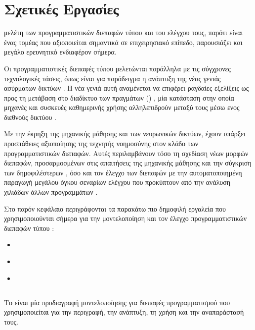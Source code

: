 \chapter{Σχετικές Εργασίες}
 μελέτη των προγραμματιστικών διεπαφών τύπου  και του ελέγχου τους,
παρότι είναι ένας τομέας που αξιοποιείται σημαντικά σε επιχειρησιακό επίπεδο,
παρουσιάζει και μεγάλο ερευνητικό ενδιαφέρον σήμερα.

Οι προγραμματιστικές διεπαφές τύπου  μελετώνται παράλληλα με τις σύγχρονες τεχνολογικές τάσεις,
όπως είναι για παράδειγμα η ανάπτυξη της νέας γενιάς ασύρματων δικτύων  \cite{mayer2018restful}.
Η νέα γενιά αυτή αναμένεται να επιφέρει ραγδαίες εξελίξεις ως προς τη μετάβαση στο διαδίκτυο των πραγμάτων () \cite{wang2018iot},
μία κατάσταση στην οποία μηχανές και συσκευές καθημερινής χρήσης αλληλεπιδρούν μεταξύ τους 
μέσω ενος διεθνούς δικτύου \cite{gubbi2013internet}. 

Με την έκρηξη της μηχανικής μάθησης και των νευρωνικών δικτύων,
έχουν υπάρξει προσπάθειες αξιοποίησης της τεχνητής νοημοσύνης στον κλάδο των προγραμματιστικών διεπαφών.
Αυτές περιλαμβάνουν 
τόσο τη σχεδίαση νέων μορφών διεπαφών, προσαρμοσμένων στις απαιτήσεις της μηχανικής μάθησης \cite{garcia2019deepaas}\cite{howard2020fastai}
και την σύγκριση των δημοφιλέστερων \cite{kubany2020comparison},
όσο και τον έλεγχο των διεπαφών με την αυτοματοποιημένη παραγωγή μεγάλου όγκου σεναρίων ελέγχου 
που προκύπτουν από την ανάλυση χιλιάδων άλλων προγραμμάτων \cite{martin2020ai}.

Στο παρόν κεφάλαιο περιγράφονται τα παρακάτω πιο δημοφιλή εργαλεία που χρησιμοποιούνται σήμερα 
για την μοντελοποίηση και τον έλεγχο προγραμματιστικών διεπαφών τύπου :

\begin{itemize}
    \item {} \cite{noauthor_oaiopenapispecification_2021}
    \item {} \cite{swagger}
    \item {} \cite{postman}
\end{itemize}

\section{}

Το  είναι μία προδιαγραφή μοντελοποίησης για  διεπαφές προγραμματισμού 
που χρησιμοποιείται για την περιγραφή, την ανάπτυξη, τη χρήση και την αναπαράστασή τους.

